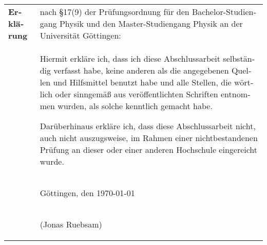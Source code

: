\begin{otherlanguage}{ngerman}
  \clearpage\thispagestyle{empty}
  \null\vfill
  \noindent
  \begin{tabular}[t]{p{}p{}}
    \bfseries\large Erkl\"arung&nach
    \S17(9)  der Prüfungsordnung für den
    Bachelor-Studiengang Physik und den Master-Studiengang Physik
    an der Universität Göttingen:\\[1em]
    &Hiermit erkläre ich, dass ich diese Abschlussarbeit
    selbständig verfasst habe, keine anderen als die
    angegebenen Quellen und Hilfsmittel benutzt habe und alle Stellen,
    die wörtlich oder sinngemä\ss{} aus veröffentlichten Schriften
    entnommen wurden, als solche kenntlich gemacht habe.

    Darüberhinaus erkläre ich, dass diese Abschlussarbeit nicht, auch nicht
    auszugsweise, im Rahmen einer nichtbestandenen Prüfung an dieser oder
    einer anderen Hochschule eingereicht wurde.\\[1em]
    &\begin{center}Göttingen, den \today\end{center}\\[1.5cm]
    &\begin{center} (Jonas Ruebsam)\end{center}
  \end{tabular}
\end{otherlanguage}
